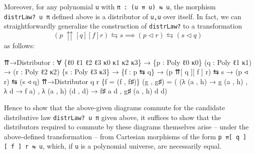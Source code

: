 \documentclass[
  11pt,
  oneside,
  article]{memoir}
\newenvironment{Shaded}{}{}
\newcommand{\NormalTok}[1]{#1}
\newcommand{\OtherTok}[1]{\textcolor[rgb]{0.00,0.44,0.13}{#1}}
\theoremstyle{definition}
\theoremstyle{plain}
\newcommand{\0}{\textsf{0}}
\newcommand{\1}{\tn{\textsf{1}}}
\begin{document}
Moreover, for any polynomial \texttt{u} with
\texttt{π\ :\ (u\ ⇈\ u)\ ⇆\ u}, the morphism \texttt{distrLaw?\ u\ π}
defined above is a distributor of \texttt{u,u} over itself. In fact, we
can straightforwardly generalize the construction of \texttt{distrLaw?}
to a transformation \[
(p ~{\upuparrows}[q][f] r) \leftrightarrows s \implies (p \triangleleft r) \leftrightarrows (s \triangleleft q)
\] as follows:

\begin{Shaded}
\begin{Highlighting}[]
\NormalTok{⇈→Distributor }\OtherTok{:} \OtherTok{∀} \OtherTok{\{}\NormalTok{ℓ0 ℓ1 ℓ2 ℓ3 κ0 κ1 κ2 κ3}\OtherTok{\}}
                \OtherTok{→} \OtherTok{\{}\NormalTok{p }\OtherTok{:}\NormalTok{ Poly ℓ0 κ0}\OtherTok{\}} \OtherTok{(}\NormalTok{q }\OtherTok{:}\NormalTok{ Poly ℓ1 κ1}\OtherTok{)}
                \OtherTok{→} \OtherTok{(}\NormalTok{r }\OtherTok{:}\NormalTok{ Poly ℓ2 κ2}\OtherTok{)} \OtherTok{\{}\NormalTok{s }\OtherTok{:}\NormalTok{ Poly ℓ3 κ3}\OtherTok{\}}
                \OtherTok{→} \OtherTok{\{}\NormalTok{f }\OtherTok{:}\NormalTok{ p ⇆ q}\OtherTok{\}}
                \OtherTok{→} \OtherTok{(}\NormalTok{p ⇈[ q ][ f ] r}\OtherTok{)}\NormalTok{ ⇆ s}
                \OtherTok{→} \OtherTok{(}\NormalTok{p ◃ r}\OtherTok{)}\NormalTok{ ⇆ }\OtherTok{(}\NormalTok{s ◃ q}\OtherTok{)}
\NormalTok{⇈→Distributor q r }\OtherTok{\{}\NormalTok{f }\OtherTok{=} \OtherTok{(}\NormalTok{f , f♯}\OtherTok{)\}} \OtherTok{(}\NormalTok{g , g♯}\OtherTok{)} \OtherTok{=}
    \OtherTok{(} \OtherTok{(λ} \OtherTok{(}\NormalTok{a , h}\OtherTok{)} \OtherTok{→}\NormalTok{ g }\OtherTok{(}\NormalTok{a , h}\OtherTok{)}\NormalTok{ , }\OtherTok{λ}\NormalTok{ d\textquotesingle{} }\OtherTok{→}\NormalTok{ f a}\OtherTok{)} 
\NormalTok{    , }\OtherTok{λ} \OtherTok{(}\NormalTok{a , h}\OtherTok{)} \OtherTok{(}\NormalTok{d\textquotesingle{} , d}\OtherTok{)}
        \OtherTok{→}\NormalTok{ f♯ a d , g♯ }\OtherTok{(}\NormalTok{a , h}\OtherTok{)}\NormalTok{ d\textquotesingle{} d}\OtherTok{)}
\end{Highlighting}
\end{Shaded}

Hence to show that the above-given diagrams commute for the candidate
distributive law \texttt{distrLaw?\ u\ π} given above, it suffices to
show that the distributors required to commute by these diagrams
themselves arise -- under the above-defined transformation -- from
Cartesian morphisms of the form
\texttt{p\ ⇈{[}\ q\ {]}{[}\ f\ {]}\ r\ ⇆\ u}, which, if \texttt{u} is a
polynomial universe, are necessarily equal.
\end{document}

